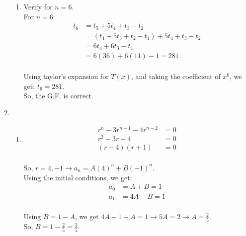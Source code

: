 \documentclass[a4paper]{article}
\begin{document}
\begin{enumerate}
\begin{enumerate}
            
            \item Verify for $n = 6$. \\
            For $n = 6$:\\ 
            \[
                \begin{split}
                    t_6 &= t_5 + 5t_4 + t_3 - t_2 \\
                    &= (t_4 + 5t_3 + t_2 - t_1) + 5t_4 + t_3 - t_2 \\
                    &= 6t_4 + 6t_3 - t_1 \\
                    &=6(36) + 6(11) - 1 = 281 \\
                \end{split}    
            \]

            Using taylor's expansion for $T(x)$, and taking the coefficient of $x^6$, we get:
            $t_6 = 281$. \\

            So, the G.F. is correct.
        \end{enumerate}


        \newpage
        \item \begin{enumerate}
            \item \[
              \begin{split}
                r^n - 3r^{n-1} - 4r^{n-2} &= 0 \\
                r^2 - 3r - 4 &= 0 \\
                (r - 4)(r + 1) &= 0 \\
              \end{split}  
            \]

            So, $r = 4, -1 \rightarrow a_n = A(4)^n + B(-1)^n$. \\

            Using the initial conditions, we get:
            \[
              \begin{split}
                a_0 &= A + B = 1 \\
                a_1 &= 4A - B = 1 \\
              \end{split}
            \]

            Using $B = 1 - A$, we get $4A - 1 + A = 1 \rightarrow 5A = 2 \rightarrow A = \frac{2}{5}$. \\
            So, $B = 1 - \frac{2}{5} = \frac{3}{5}$. \\


\end{enumerate}
\end{enumerate}
\end{document}
